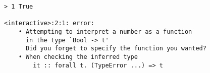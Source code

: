 \begin{repl}\begin{lstlisting}
> 1 True

<interactive>:2:1: error:
    • Attempting to interpret a number as a function 
      in the type `Bool -> t'
      Did you forget to specify the function you wanted?
    • When checking the inferred type
        it :: forall t. (TypeError ...) => t\end{lstlisting}\end{repl}
